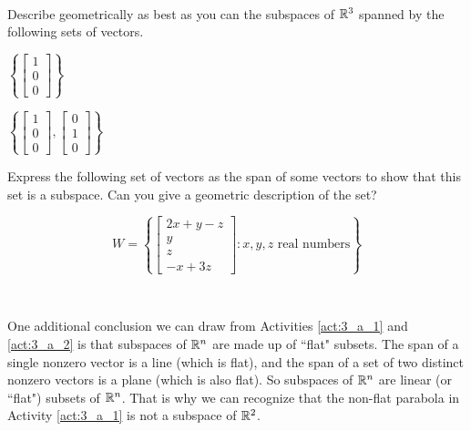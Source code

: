 \begin{activity} \label{act:3_a_2} ~
\ba 
\item Describe geometrically as best as you can the subspaces of $\mathbb{R}^3$ spanned by the following sets of vectors. 

$\left\{\left[ \begin{array}{c} 1 \\ 0 \\0\end{array} \right]\right\}$



$\left\{\left[ \begin{array}{c} 1 \\ 0\\0 \end{array} \right], \left[ \begin{array}{r} 0 \\ 1\\0 \end{array} \right]\right\}$ 



\item Express the following set of vectors as the span of some vectors to show that this set is a subspace. Can you give a geometric description of the set?

\[ W = \left\{ \left[ \begin{array}{c} 2x+y-z \\ y \\ z \\ -x+3z \end{array} \right]: x, y, z \text{ real numbers} \right \} \]


\ea
\
\end{activity}



One additional conclusion we can draw from Activities \ref{act:3_a_1} and \ref{act:3_a_2} is that subspaces of $\mathbb{R}^n$ are made up of ``flat" subsets. The span of a single nonzero vector is a line (which is flat), and the span of a set of two distinct nonzero vectors is a plane (which is also flat). So subspaces of $\mathbb{R}^n$ are linear (or ``flat") subsets of $\mathbb{R}^n$. That is why we can recognize that the non-flat parabola in Activity \ref{act:3_a_1} is not a subspace of $\mathbb{R}^2$. 
 



\ExampleIntro

